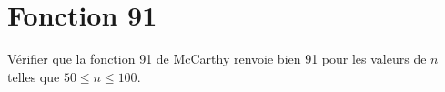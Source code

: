 \section*{Fonction 91}
Vérifier que la fonction 91 de McCarthy renvoie bien 91 pour les
valeurs de $n$ telles que  $50\leq n\leq 100$.


